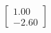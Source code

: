 \documentclass[preview]{standalone}
\begin{document}
\begin{align*}
\begin{bmatrix} 1.00 \\ -2.60 \end{bmatrix}
\end{align*}
\end{document}
